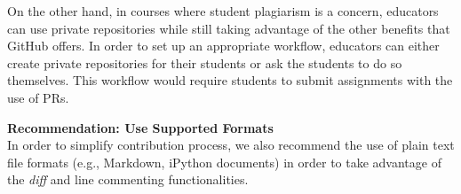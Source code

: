 
On the other hand, in courses where student plagiarism is a concern, educators can use private repositories while still taking advantage of the other benefits that GitHub offers. In order to set up an appropriate workflow, educators can either create private repositories for their students or ask the students to do so themselves. This workflow would require students to submit assignments with the use of PRs.

\textbf{Recommendation: Use Supported Formats}\\
In order to simplify contribution process, we also recommend the use of plain text file formats (e.g., Markdown, iPython documents) in order to take advantage of the \textit{diff} and line commenting functionalities.


